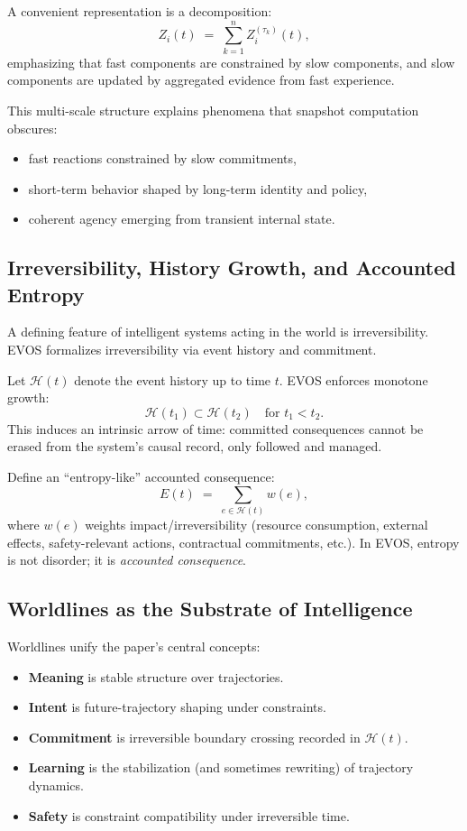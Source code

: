 \documentclass[11pt]{article}
\begin{document}
A convenient representation is a decomposition:
\[
Z_i(t) \;=\; \sum_{k=1}^n Z_i^{(\tau_k)}(t),
\]
emphasizing that fast components are constrained by slow components, and slow components
are updated by aggregated evidence from fast experience.

This multi-scale structure explains phenomena that snapshot computation obscures:
\begin{itemize}
  \item fast reactions constrained by slow commitments,
  \item short-term behavior shaped by long-term identity and policy,
  \item coherent agency emerging from transient internal state.
\end{itemize}

\subsection{Irreversibility, History Growth, and Accounted Entropy}

A defining feature of intelligent systems acting in the world is irreversibility. EVOS
formalizes irreversibility via event history and commitment.

Let $\mathcal{H}(t)$ denote the event history up to time $t$. EVOS enforces monotone
growth:
\[
\mathcal{H}(t_1) \subset \mathcal{H}(t_2) \quad \text{for } t_1 < t_2.
\]
This induces an intrinsic arrow of time: committed consequences cannot be erased from the
system's causal record, only followed and managed.

Define an ``entropy-like'' accounted consequence:
\[
E(t) \;=\; \sum_{e \in \mathcal{H}(t)} w(e),
\]
where $w(e)$ weights impact/irreversibility (resource consumption, external effects,
safety-relevant actions, contractual commitments, etc.). In EVOS, entropy is not disorder;
it is \emph{accounted consequence}.

\subsection{Worldlines as the Substrate of Intelligence}

Worldlines unify the paper's central concepts:

\begin{itemize}
  \item \textbf{Meaning} is stable structure over trajectories.
  \item \textbf{Intent} is future-trajectory shaping under constraints.
  \item \textbf{Commitment} is irreversible boundary crossing recorded in $\mathcal{H}(t)$.
  \item \textbf{Learning} is the stabilization (and sometimes rewriting) of trajectory
  dynamics.
  \item \textbf{Safety} is constraint compatibility under irreversible time.
\end{itemize}
\end{document}
